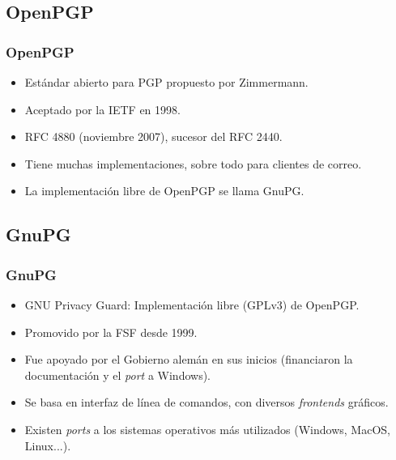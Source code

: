 \documentclass{beamer}
\begin{document}
\subsection{OpenPGP}

\begin{frame}
\frametitle{OpenPGP}

\begin{itemize}
\item Estándar abierto para PGP propuesto por Zimmermann. 
\item Aceptado por la IETF en 1998.
\item RFC 4880 (noviembre 2007), sucesor del RFC 2440.
\item Tiene muchas implementaciones, sobre todo para clientes de correo.
\item La implementación \alert{libre} de OpenPGP se llama \alert{GnuPG}.
\end{itemize}

\end{frame}

\subsection{GnuPG}


\begin{frame}
\frametitle{GnuPG}

\begin{itemize}
\item \alert{GNU Privacy Guard}: Implementación libre (GPLv3) de OpenPGP.
\item Promovido por la FSF desde 1999.
\item Fue apoyado por el Gobierno alemán en sus inicios (financiaron la documentación y el \textit{port} a Windows).
\item Se basa en interfaz de línea de comandos, con diversos \textit{frontends} gráficos.
\item Existen \textit{ports} a los sistemas operativos más utilizados (Windows, MacOS, Linux...).
\end{itemize}

\end{frame}



\end{document}
